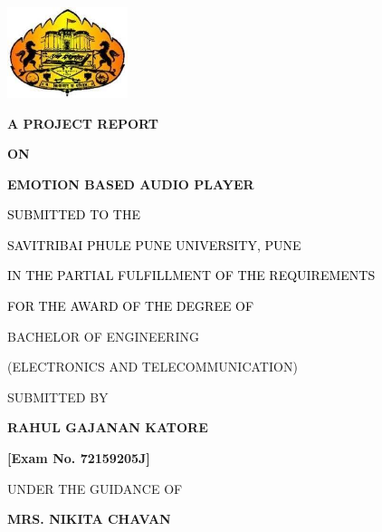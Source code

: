 \documentclass[a4paper]{article}
\title{}
\author{}
\date{}
\begin{document}
\clearpage\setcounter{page}{1}\pagestyle{Standard}
{\centering  \includegraphics[width=1.3862in,height=1.0409in]{rahulop-img001.png} \par}
{\centering
\textbf{A PROJECT REPORT }
\par}

{\centering
\textbf{ON}
\par}


\bigskip

{\centering
\textbf{EMOTION BASED AUDIO PLAYER}
\par}


\bigskip

{\centering
\textcolor{black}{SUBMITTED TO THE }
\par}

{\centering
\textcolor{black}{SAVITRIBAI PHULE PUNE UNIVERSITY, PUNE }
\par}


\bigskip

{\centering
\textcolor{black}{IN THE PARTIAL FULFILLMENT OF THE REQUIREMENTS}
\par}

{\centering
\textcolor{black}{FOR THE AWARD OF THE DEGREE OF}
\par}

{\centering
BACHELOR OF ENGINEERING
\par}

{\centering
(ELECTRONICS AND TELECOMMUNICATION) 
\par}


\bigskip

{\centering
SUBMITTED BY
\par}


\bigskip

{\centering
\textbf{RAHUL GAJANAN KATORE}
\par}

{\centering
\textbf{[Exam No. 72159205J]}
\par}

{\centering
UNDER THE GUIDANCE OF
\par}


\bigskip

{\centering
\textbf{MRS. NIKITA CHAVAN}
\par}
\end{document}
